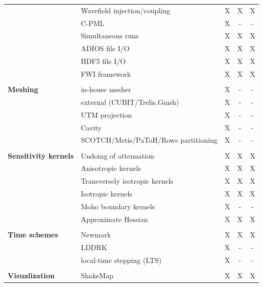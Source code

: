 \begin{table}[htp]
\begin{center}
\begin{tabular}{ l l c c c}
                        & Wavefield injection/coupling      & X  & X  & X \\
                        & C-PML                             & X  & -  & - \\
                        & Simultaneous runs                 & X  & X  & X \\
                        & ADIOS file I/O                    & X  & X  & X \\
                        & HDF5 file I/O                     & X  & X  & X \\
                        & FWI framework                     & X  & X  & X \\

\hline
& & & & \\
{\bf Meshing}           & in-house mesher                       & X  & -  & - \\
                        & external (CUBIT/Trelis,Gmsh)          & X  & -  & - \\
                        & UTM projection                        & X  & -  & - \\
                        & Cavity                                & X  & -  & - \\
                        & SCOTCH/Metis/PaToH/Rows partitioning  & X  & -  & - \\
\hline
& & & & \\
{\bf Sensitivity kernels} & Undoing of attenuation          & X  & X  & X \\
                          & Anisotropic kernels             & X  & X  & X \\
                          & Transversely isotropic kernels  & X  & X  & X \\
                          & Isotropic kernels               & X  & X  & X \\
                          & Moho boundary kernels           & X  & -  & - \\
                          & Approximate Hessian             & X  & X  & X \\
\hline
& & & & \\
{\bf Time schemes}  & Newmark   & X  & X  & X  \\
                    & LDDRK     & X  & -  & -  \\
                    & local-time stepping (LTS) & X  & -  & -  \\
\hline
& & & & \\
{\bf Visualization} & ShakeMap          & X  & X  & X \\

\end{tabular}
\end{center}
\end{table}
